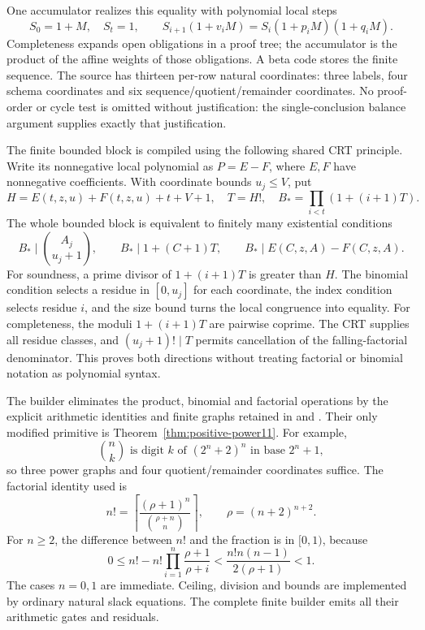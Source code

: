 One accumulator realizes this equality with polynomial local steps
\[
 S_0=1+M,\quad S_t=1,\qquad
 S_{i+1}(1+v_iM)=S_i(1+p_iM)(1+q_iM).
\]
Completeness expands open obligations in a proof tree; the accumulator
is the product of the affine weights of those obligations. A beta code
stores the finite sequence. The source has thirteen per-row natural
coordinates: three labels, four schema coordinates and six
sequence/quotient/remainder coordinates. No proof-order or cycle test
is omitted without justification: the single-conclusion balance
argument supplies exactly that justification.

The finite bounded block is compiled using the following shared CRT
principle. Write its nonnegative local polynomial as $P=E-F$, where
$E,F$ have nonnegative coefficients. With coordinate bounds $u_j\le V$,
put
\[
 H=E(t,z,u)+F(t,z,u)+t+V+1,\quad T=H!,\quad
 B_*=\prod_{i<t}(1+(i+1)T).
\]
The whole bounded block is equivalent to finitely many existential
conditions
\[
 B_*\mid\binom{A_j}{u_j+1},\qquad
 B_*\mid1+(C+1)T,\qquad
 B_*\mid E(C,z,A)-F(C,z,A).
\]
For soundness, a prime divisor of $1+(i+1)T$ is greater than $H$.
The binomial condition selects a residue in $[0,u_j]$ for each
coordinate, the index condition selects residue $i$, and the size
bound turns the local congruence into equality. For completeness,
the moduli $1+(i+1)T$ are pairwise coprime. The CRT supplies all
residue classes, and $(u_j+1)!\mid T$ permits cancellation of the
falling-factorial denominator. This proves both directions without
treating factorial or binomial notation as polynomial syntax.

The builder eliminates the product, binomial and factorial operations
by the explicit arithmetic identities and finite graphs retained in
 and
. Their only modified
primitive is Theorem~\ref{thm:positive-power11}. For example,
\[
 \binom nk\text{ is digit }k\text{ of }(2^n+2)^n
       \text{ in base }2^n+1,
\]
so three power graphs and four quotient/remainder coordinates suffice.
The factorial identity used is
\[
 n!=\left\lceil
 \frac{(\rho+1)^n}{\binom{\rho+n}{n}}
 \right\rceil,\qquad \rho=(n+2)^{n+2}.
\]
For $n\ge2$, the difference between $n!$ and the fraction is in
$[0,1)$, because
\[
 0\le n!-n!\prod_{i=1}^n\frac{\rho+1}{\rho+i}
 <\frac{n!n(n-1)}{2(\rho+1)}<1.
\]
The cases $n=0,1$ are immediate. Ceiling, division and bounds are
implemented by ordinary natural slack equations. The complete finite
builder emits all their arithmetic gates and residuals.

